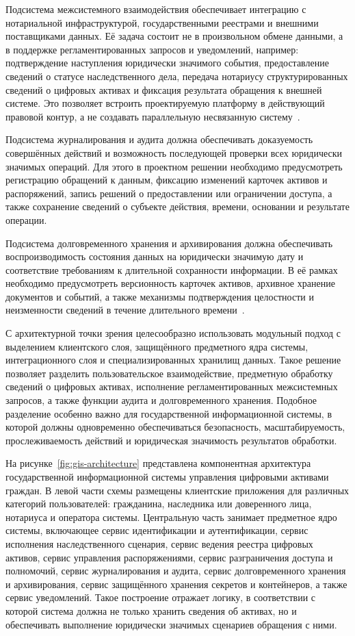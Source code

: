 Подсистема межсистемного взаимодействия обеспечивает интеграцию с нотариальной инфраструктурой, государственными реестрами и внешними поставщиками данных. Её задача состоит не в произвольном обмене данными, а в поддержке регламентированных запросов и уведомлений, например: подтверждение наступления юридически значимого события, предоставление сведений о статусе наследственного дела, передача нотариусу структурированных сведений о цифровых активах и фиксация результата обращения к внешней системе. Это позволяет встроить проектируемую платформу в действующий правовой контур, а не создавать параллельную несвязанную систему~\cite{Haritonova2024HSE}.

Подсистема журналирования и аудита должна обеспечивать доказуемость совершённых действий и возможность последующей проверки всех юридически значимых операций. Для этого в проектном решении необходимо предусмотреть регистрацию обращений к данным, фиксацию изменений карточек активов и распоряжений, запись решений о предоставлении или ограничении доступа, а также сохранение сведений о субъекте действия, времени, основании и результате операции.

Подсистема долговременного хранения и архивирования должна обеспечивать воспроизводимость состояния данных на юридически значимую дату и соответствие требованиям к длительной сохранности информации. В её рамках необходимо предусмотреть версионность карточек активов, архивное хранение документов и событий, а также механизмы подтверждения целостности и неизменности сведений в течение длительного времени~\cite{iso14721_2025, iso16363_2025, iso19005_4_2020}.

С архитектурной точки зрения целесообразно использовать модульный подход с выделением клиентского слоя, защищённого предметного ядра системы, интеграционного слоя и специализированных хранилищ данных. Такое решение позволяет разделить пользовательское взаимодействие, предметную обработку сведений о цифровых активах, исполнение регламентированных межсистемных запросов, а также функции аудита и долговременного хранения. Подобное разделение особенно важно для государственной информационной системы, в которой должны одновременно обеспечиваться безопасность, масштабируемость, прослеживаемость действий и юридическая значимость результатов обработки.

На рисунке~\ref{fig:gis-architecture} представлена компонентная архитектура государственной информационной системы управления цифровыми активами граждан. В левой части схемы размещены клиентские приложения для различных категорий пользователей: гражданина, наследника или доверенного лица, нотариуса и оператора системы. Центральную часть занимает предметное ядро системы, включающее сервис идентификации и аутентификации, сервис исполнения наследственного сценария, сервис ведения реестра цифровых активов, сервис управления распоряжениями, сервис разграничения доступа и полномочий, сервис журналирования и аудита, сервис долговременного хранения и архивирования, сервис защищённого хранения секретов и контейнеров, а также сервис уведомлений. Такое построение отражает логику, в соответствии с которой система должна не только хранить сведения об активах, но и обеспечивать выполнение юридически значимых сценариев обращения с ними.

